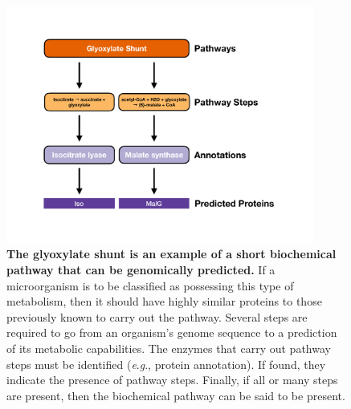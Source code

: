 \begin{figure}[!ht]
  \centering
	\includegraphics[width=0.9\textwidth]{media/pathway_analysis_steps.pdf}
	 \caption[The glyoxylate shunt is an example of a short biochemical pathway 
that can be genomically predicted.]{\textbf{The glyoxylate shunt is an example 
of a short biochemical pathway that can be genomically predicted.} If a 
microorganism is to be classified as possessing this type of metabolism, then it 
should have highly similar proteins to those previously known to carry out the 
pathway. Several steps are required to go from an organism's genome sequence to 
a prediction of its metabolic capabilities. The enzymes that carry out pathway 
steps must be identified (\textit{e}.\textit{g}., protein annotation). If found, they indicate the 
presence of pathway steps. Finally, if all or many steps are present, then the 
biochemical pathway can be said to be present.}
	 \label{fig:pathway-analysis-steps}
\end{figure}

